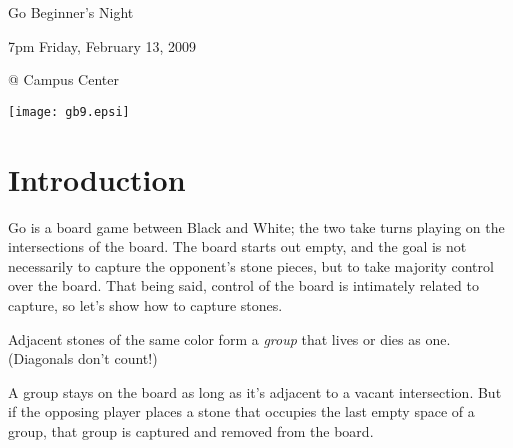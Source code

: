 \documentclass{article}
\begin{document}
\centerline{\Huge Go Beginner's Night}
\centerline{\Huge 7pm Friday, February 13, 2009}
\centerline{\Huge @ Campus Center}
\vfill

\begin{center}
\texttt{[image: gb9.epsi]}
\end{center}

\vfill

\newpage

\section*{Introduction}
Go is a board game between Black and White; the two take turns playing
on the intersections of the board.  The board starts out empty, and
the goal is not necessarily to capture the opponent's stone pieces, but to
take majority control over the board.  That being said, control of the
board is intimately related to capture, so let's show how to capture
stones.

Adjacent stones of the same color form a \emph{group} that lives or
dies as one.  (Diagonals don't count!)

\begin{center}
\cleargoban
{}
\hspace{.5in}%
\hspace{.5in}%
\end{center}
%
A group stays on the board as long as it's adjacent to a vacant
intersection.  But if the opposing player places a stone that occupies
the last empty space of a group, that group is captured and removed
from the board.


\begin{center}
\end{center}
\end{document}
